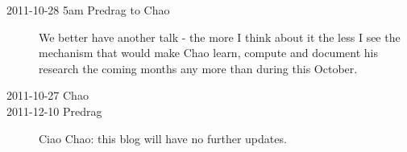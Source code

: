 \begin{description}
\item[2011-10-28 5am Predrag to Chao]
We better have another talk - the more I think about it the less I see
the mechanism that would make Chao learn, compute and document his
research the coming months any more than during this October.

\item[2011-10-27 Chao] 

\item[2011-12-10 Predrag] Ciao Chao: this blog will have no further updates.


\end{description}
